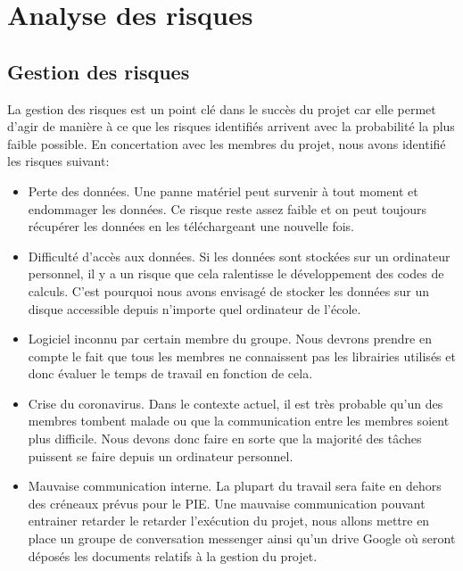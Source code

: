 \chapter*{Analyse des risques}
\label{sec:risques}
\section*{Gestion des risques}
La gestion des risques est un point clé dans le succès du projet car elle permet d'agir de manière à ce que les risques identifiés arrivent avec la probabilité la plus faible possible. En concertation avec les membres du projet, nous avons identifié les risques suivant:

\begin{itemize}
	\item Perte des données. Une panne matériel peut survenir à tout moment et endommager les données. Ce risque reste assez faible et on peut toujours récupérer les données en les téléchargeant une nouvelle fois.
	
	\item Difficulté d'accès aux données. Si les données sont stockées sur un ordinateur personnel, il y a un risque que cela ralentisse le développement des codes de calculs. C'est pourquoi nous avons envisagé de stocker les données sur un disque accessible depuis n'importe quel ordinateur de l'école.
	
	\item Logiciel inconnu par certain membre du groupe. Nous devrons prendre en compte le fait que tous les membres ne connaissent pas les librairies utilisés et donc évaluer le temps de travail en fonction de cela.
	
	\item Crise du coronavirus. Dans le contexte actuel, il est très probable qu'un des membres tombent malade ou que la communication entre les membres soient plus difficile. Nous devons donc faire en sorte que la majorité des tâches puissent se faire depuis un ordinateur personnel.
	
	\item Mauvaise communication interne. La plupart du travail sera faite en dehors des créneaux prévus pour le PIE. Une mauvaise communication pouvant entrainer retarder le retarder l'exécution du projet, nous allons mettre en place un groupe de conversation messenger ainsi qu'un drive Google où seront déposés les documents relatifs à la gestion du projet.
	
\end{itemize}


